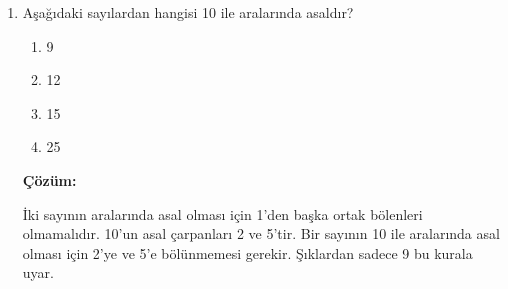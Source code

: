\documentclass[12pt,a4paper]{article}
\begin{document}
\begin{enumerate}
  \item Aşağıdaki sayılardan hangisi 10 ile aralarında asaldır?
  \begin{enumerate}
    \item 9
    \item 12
    \item 15
    \item 25
  \end{enumerate}
  \vspace{5pt}
  \par\noindent\textbf{Çözüm:}
  \par\noindent İki sayının aralarında asal olması için 1'den başka ortak bölenleri olmamalıdır. 10'un asal çarpanları 2 ve 5'tir. Bir sayının 10 ile aralarında asal olması için 2'ye ve 5'e bölünmemesi gerekir. Şıklardan sadece 9 bu kurala uyar.\vspace{1cm}

\end{enumerate}
\end{document}
